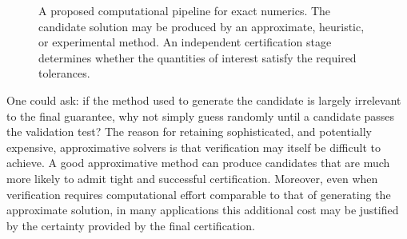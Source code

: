 \documentclass{article}
\theoremstyle{definition}
\begin{document}
\begin{figure}[H]

    \caption{A proposed computational pipeline for exact numerics. The candidate
    solution may be produced by an approximate, heuristic, or experimental
    method. An independent certification stage determines whether the quantities
    of interest satisfy the required tolerances.}
    \label{fig:exact-numerics-pipeline}
\end{figure}

One could ask: if the method used to generate the candidate is largely irrelevant to the final guarantee, why not simply guess randomly until a candidate passes the validation test? The reason for retaining sophisticated, and potentially expensive, approximative solvers is that verification may itself be difficult to achieve. A good approximative method can produce candidates that are much more likely to admit tight and successful certification. Moreover, even when verification requires computational effort comparable to that of generating the approximate solution, in many applications this additional cost may be justified by the certainty provided by the final certification.
\end{document}
